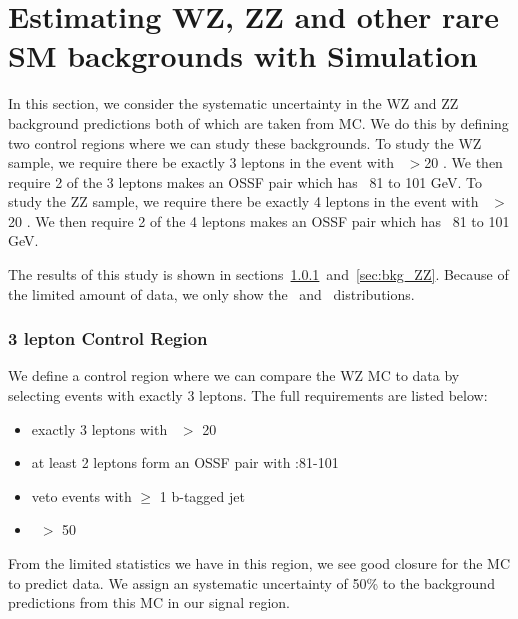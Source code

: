 \clearpage

\section{Estimating WZ, ZZ and other rare SM backgrounds with Simulation}
\label{sec:bkg_rareSMBG}

In this section, we consider the systematic uncertainty in the WZ and ZZ background predictions both of which are taken from MC.
We do this by defining two control regions where we can study these backgrounds.
To study the WZ sample, we require there be exactly 3 leptons in the event with \pt~$>$20 \gev.
We then require 2 of the 3 leptons makes an OSSF pair which has \mll~81 to 101 GeV.
To study the ZZ sample, we require there be exactly 4 leptons in the event with \pt~$>$20 \gev.
We then require 2 of the 4 leptons makes an OSSF pair which has \mll~81 to 101 GeV.

The results of this study is shown in sections~\ref{sec:bkg_WZ}~and~\ref{sec:bkg_ZZ}.
Because of the limited amount of data, we only show the \MET\ and \nj\ distributions.

\subsubsection{3 lepton Control Region}
\label{sec:bkg_WZ}

We define a control region where we can compare the WZ MC to data by selecting events with exactly 3 leptons.
The full requirements are listed below:

\begin{itemize}
\item exactly 3 leptons with \pt\ $>$ 20 \gev
\item at least 2 leptons form an OSSF pair with \mll:81-101 \gev
\item veto events with $\geq$ 1 b-tagged jet
\item \MET\ $>$ 50 \gev 
\end{itemize}

From the limited statistics we have in this region, we see good closure for the MC to predict data.
We assign an systematic uncertainty of 50\% to the background predictions from this MC in our signal region.

